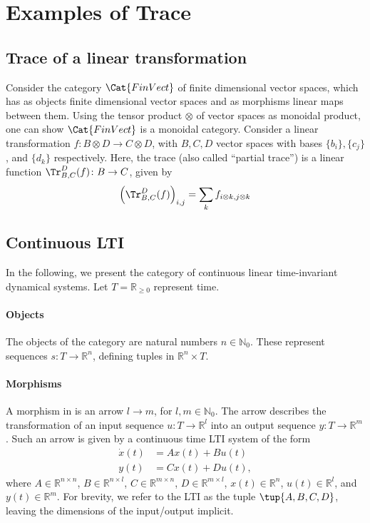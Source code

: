 \section{Examples of Trace}
\subsection{Trace of a linear transformation}
Consider the category $\Cat{FinVect}$ of finite dimensional vector spaces, which has as objects finite dimensional vector spaces and as morphisms linear maps between them. Using the tensor product $\otimes$ of vector spaces as monoidal product, one can show $\Cat{FinVect}$ is a monoidal category. Consider a linear transformation $f\colon B\otimes D\to C\otimes D$, with $B,C,D$ vector spaces with bases $\{b_i\},\{c_j\}$, and $\{d_k\}$ respectively. Here, the trace (also called ``partial trace'') is a linear function $\Tr_{B,C}
^D(f)\colon B\to C$, given by
    \begin{equation}
    \left(\Tr_{B,C}
^D(f) \right)_{i,j}=\sum_{k}f_{i\otimes k,j\otimes k}
    \end{equation}
\subsection{Continuous LTI}
In the following, we present the category of continuous linear time-invariant dynamical systems. Let $T=\mathbb{R}_{\geq 0}$ represent time.

\paragraph{Objects} The objects of the category are natural numbers $n\in \mathbb{N}_0$. These represent sequences $s\colon T\to \mathbb{R}^n$, defining tuples in $\mathbb{R}^n\times T$.

\paragraph{Morphisms} A morphism in  is an arrow $l\to m$, for $l,m\in \mathbb{N}_0$. The arrow describes the transformation of an input sequence $u\colon T\to \mathbb{R}^l$ into an output sequence $y\colon T\to \mathbb{R}^m$. Such an arrow is given by a continuous time LTI system of the form
\begin{equation}
\begin{aligned}
    \dot{x}(t)&=Ax(t)+Bu(t)\\
    y(t)&=Cx(t)+Du(t),
\end{aligned}
\end{equation}
where $A\in \mathbb{R}^{n\times n}$, $B\in \mathbb{R}^{n\times l}$, $C\in \mathbb{R}^{m\times n}$, $D\in \mathbb{R}^{m\times l}$, $x(t)\in \mathbb{R}^n$, $u(t)\in \mathbb{R}^l$, and $y(t)\in \mathbb{R}^m$. For brevity, we refer to the LTI as the tuple $\tup{A,B,C,D}$, leaving the dimensions of the input/output implicit.

